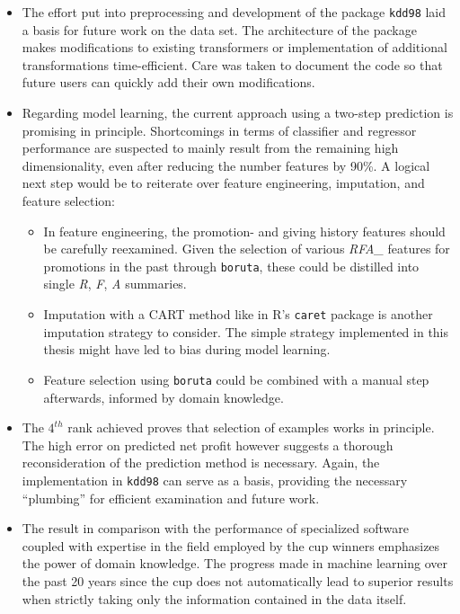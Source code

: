 \documentclass[
  11pt,
  a4paper,
  DIV=12,captions=tableheading,oneside,titlepage]{scrbook}
\providecommand{\tightlist}{%
  \setlength{\itemsep}{0pt}\setlength{\parskip}{0pt}}
\begin{document}
\begin{itemize}
\item
  The effort put into preprocessing and development of the package \texttt{kdd98} laid a basis for future work on the data set. The architecture of the package makes modifications to existing transformers or implementation of additional transformations time-efficient. Care was taken to document the code so that future users can quickly add their own modifications.
\item
  Regarding model learning, the current approach using a two-step prediction is promising in principle. Shortcomings in terms of classifier and regressor performance are suspected to mainly result from the remaining high dimensionality, even after reducing the number features by 90\%. A logical next step would be to reiterate over feature engineering, imputation, and feature selection:

  \begin{itemize}
  \tightlist
  \item
    In feature engineering, the promotion- and giving history features should be carefully reexamined. Given the selection of various \emph{RFA\_} features for promotions in the past through \texttt{boruta}, these could be distilled into single \emph{R}, \emph{F}, \emph{A} summaries.
  \item
    Imputation with a CART method like in R's \texttt{caret} package is another imputation strategy to consider. The simple strategy implemented in this thesis might have led to bias during model learning.
  \item
    Feature selection using \texttt{boruta} could be combined with a manual step afterwards, informed by domain knowledge.
  \end{itemize}
\item
  The \(4^{th}\) rank achieved proves that selection of examples works in principle. The high error on predicted net profit however suggests a thorough reconsideration of the prediction method is necessary. Again, the implementation in \texttt{kdd98} can serve as a basis, providing the necessary ``plumbing'' for efficient examination and future work.
\item
  The result in comparison with the performance of specialized software coupled with expertise in the field employed by the cup winners emphasizes the power of domain knowledge. The progress made in machine learning over the past 20 years since the cup does not automatically lead to superior results when strictly taking only the information contained in the data itself.
\end{itemize}
\end{document}
